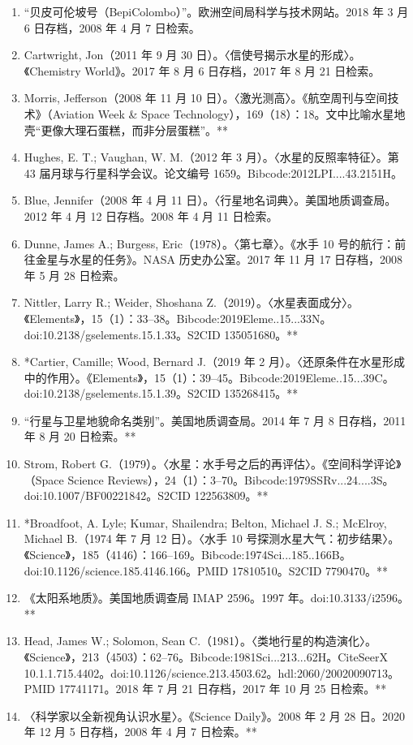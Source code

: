 \begin{enumerate}
    \item “贝皮可伦坡号（BepiColombo）”。欧洲空间局科学与技术网站。2018 年 3 月 6 日存档，2008 年 4 月 7 日检索。
    \item Cartwright, Jon（2011 年 9 月 30 日）。〈信使号揭示水星的形成〉。《Chemistry World》。2017 年 8 月 6 日存档，2017 年 8 月 21 日检索。
    \item Morris, Jefferson（2008 年 11 月 10 日）。〈激光测高〉。《航空周刊与空间技术》（Aviation Week & Space Technology），169（18）：18。文中比喻水星地壳“更像大理石蛋糕，而非分层蛋糕”。**
    \item Hughes, E. T.; Vaughan, W. M.（2012 年 3 月）。〈水星的反照率特征〉。第 43 届月球与行星科学会议。论文编号 1659。Bibcode:2012LPI....43.2151H。
    \item Blue, Jennifer（2008 年 4 月 11 日）。〈行星地名词典〉。美国地质调查局。2012 年 4 月 12 日存档。2008 年 4 月 11 日检索。
    \item Dunne, James A.; Burgess, Eric（1978）。〈第七章〉。《水手 10 号的航行：前往金星与水星的任务》。NASA 历史办公室。2017 年 11 月 17 日存档，2008 年 5 月 28 日检索。
    \item Nittler, Larry R.; Weider, Shoshana Z.（2019）。〈水星表面成分〉。《Elements》，15（1）：33–38。Bibcode:2019Eleme..15...33N。doi:10.2138/gselements.15.1.33。S2CID 135051680。**

    \item *Cartier, Camille; Wood, Bernard J.（2019 年 2 月）。〈还原条件在水星形成中的作用〉。《Elements》，15（1）：39–45。Bibcode:2019Eleme..15...39C。doi:10.2138/gselements.15.1.39。S2CID 135268415。**

    \item “行星与卫星地貌命名类别”。美国地质调查局。2014 年 7 月 8 日存档，2011 年 8 月 20 日检索。**
    \item Strom, Robert G.（1979）。〈水星：水手号之后的再评估〉。《空间科学评论》（Space Science Reviews），24（1）：3–70。Bibcode:1979SSRv...24....3S。doi:10.1007/BF00221842。S2CID 122563809。**
    \item *Broadfoot, A. Lyle; Kumar, Shailendra; Belton, Michael J. S.; McElroy, Michael B.（1974 年 7 月 12 日）。〈水手 10 号探测水星大气：初步结果〉。《Science》，185（4146）：166–169。Bibcode:1974Sci...185..166B。doi:10.1126/science.185.4146.166。PMID 17810510。S2CID 7790470。**
    \item 《太阳系地质》。美国地质调查局 IMAP 2596。1997 年。doi:10.3133/i2596。**
    \item Head, James W.; Solomon, Sean C.（1981）。〈类地行星的构造演化〉。《Science》，213（4503）：62–76。Bibcode:1981Sci...213...62H。CiteSeerX 10.1.1.715.4402。doi:10.1126/science.213.4503.62。hdl:2060/20020090713。PMID 17741171。2018 年 7 月 21 日存档，2017 年 10 月 25 日检索。**
    \item 〈科学家以全新视角认识水星〉。《Science Daily》。2008 年 2 月 28 日。2020 年 12 月 5 日存档，2008 年 4 月 7 日检索。**

\end{enumerate}

